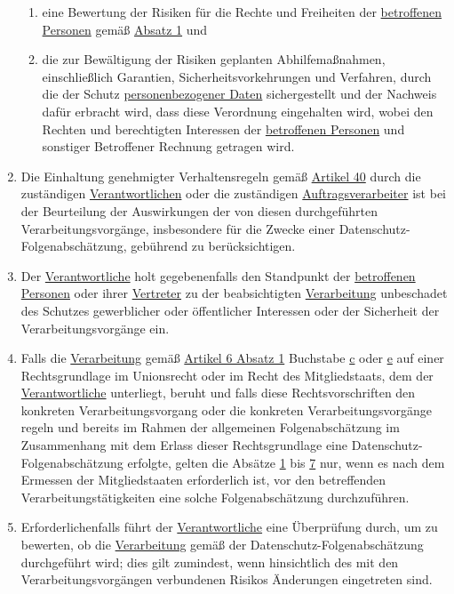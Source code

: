 \begin{enumerate}
\begin{enumerate}
    \item eine Bewertung der Risiken für die Rechte und Freiheiten der \hyperref[itm:04-1]{betroffenen Personen}
     gemäß \hyperref[itm:35-1]{Absatz 1} und%
    \label{itm:35-7c}

    \item die zur Bewältigung der Risiken geplanten Abhilfemaßnahmen, einschließlich Garantien, Sicherheitsvorkehrungen
     und Verfahren, durch die der Schutz \hyperref[itm:04-1]{personenbezogener Daten} sichergestellt und der Nachweis
     dafür erbracht wird, dass diese Verordnung eingehalten wird, wobei den Rechten und berechtigten Interessen
     der \hyperref[itm:04-1]{betroffenen Personen} und sonstiger Betroffener Rechnung getragen wird.%
    \label{itm:35-7d}

  \end{enumerate}

  \item Die Einhaltung genehmigter Verhaltensregeln gemäß \hyperref[ch:40]{Artikel 40} durch die zuständigen
   \hyperref[itm:04-7]{Verantwortlichen} oder die zuständigen \hyperref[itm:04-8]{Auftragsverarbeiter} ist bei der
    Beurteilung der Auswirkungen der von diesen durchgeführten Verarbeitungsvorgänge, insbesondere für die Zwecke einer
    Datenschutz-Folgenabschätzung, gebührend zu berücksichtigen.%
  \label{itm:35-8}

  \item Der \hyperref[itm:04-7]{Verantwortliche} holt gegebenenfalls den Standpunkt der \hyperref[itm:04-1]
   {betroffenen Personen} oder ihrer \hyperref[itm:04-17]{Vertreter} zu der beabsichtigten \hyperref[itm:04-2]
   {Verarbeitung} unbeschadet des Schutzes gewerblicher oder öffentlicher Interessen oder der Sicherheit der
   Verarbeitungsvorgänge ein.%
  \label{itm:35-9}

  \item Falls die \hyperref[itm:04-2]{Verarbeitung} gemäß \hyperref[itm:06-1]{Artikel 6 Absatz 1} Buchstabe \hyperref
   [itm:06-1c]{c} oder \hyperref[itm:06-1e]{e} auf einer Rechtsgrundlage im Unionsrecht oder im Recht des
   Mitgliedstaats, dem der
   \hyperref[itm:04-7]{Verantwortliche} unterliegt, beruht und falls diese Rechtsvorschriften den konkreten
    Verarbeitungsvorgang oder die konkreten Verarbeitungsvorgänge regeln und bereits im Rahmen der allgemeinen
    Folgenabschätzung im Zusammenhang mit dem Erlass dieser Rechtsgrundlage eine Datenschutz-Folgenabschätzung
    erfolgte, gelten die Absätze \hyperref[itm:35-1]{1} bis \hyperref[itm:35-7]{7} nur, wenn es nach dem Ermessen der
    Mitgliedstaaten erforderlich ist, vor den betreffenden Verarbeitungstätigkeiten eine solche Folgenabschätzung
    durchzuführen.%
  \label{itm:35-10}

  \item Erforderlichenfalls führt der \hyperref[itm:04-7]{Verantwortliche} eine Überprüfung durch, um zu bewerten, ob
   die \hyperref[itm:04-2]{Verarbeitung} gemäß der Datenschutz-Folgenabschätzung durchgeführt wird; dies gilt
   zumindest, wenn hinsichtlich des mit den Verarbeitungsvorgängen verbundenen Risikos Änderungen eingetreten sind.%
  \label{itm:35-11}

\end{enumerate}


